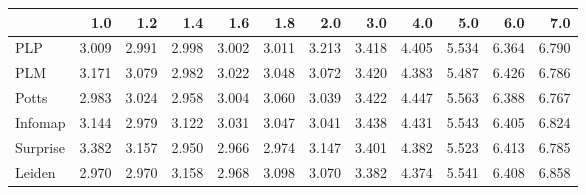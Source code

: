 \begin{tabular}{lrrrrrrrrrrr}
\toprule
{} &   1.0 &   1.2 &   1.4 &   1.6 &   1.8 &   2.0 &   3.0 &   4.0 &   5.0 &   6.0 &   7.0 \\
\midrule
PLP      & 3.009 & 2.991 & 2.998 & 3.002 & 3.011 & 3.213 & 3.418 & 4.405 & 5.534 & 6.364 & 6.790 \\
PLM      & 3.171 & 3.079 & 2.982 & 3.022 & 3.048 & 3.072 & 3.420 & 4.383 & 5.487 & 6.426 & 6.786 \\
Potts    & 2.983 & 3.024 & 2.958 & 3.004 & 3.060 & 3.039 & 3.422 & 4.447 & 5.563 & 6.388 & 6.767 \\
Infomap  & 3.144 & 2.979 & 3.122 & 3.031 & 3.047 & 3.041 & 3.438 & 4.431 & 5.543 & 6.405 & 6.824 \\
Surprise & 3.382 & 3.157 & 2.950 & 2.966 & 2.974 & 3.147 & 3.401 & 4.382 & 5.523 & 6.413 & 6.785 \\
Leiden   & 2.970 & 2.970 & 3.158 & 2.968 & 3.098 & 3.070 & 3.382 & 4.374 & 5.541 & 6.408 & 6.858 \\
\bottomrule
\end{tabular}
